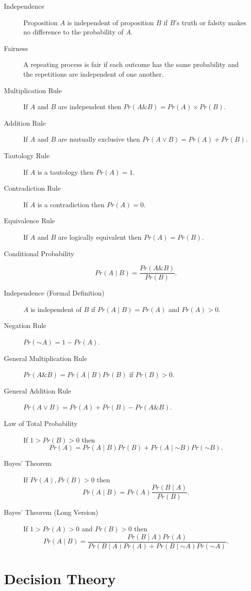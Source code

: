 \documentclass[justified]{tufte-book}
\newcommand{\given}{\mid}
\renewcommand{\neg}{\mathbin{\sim}}
\renewcommand{\wedge}{\mathbin{\&}}
\newcommand{\p}{Pr}
\theoremstyle{definition}
\theoremstyle{definition}
\theoremstyle{definition}
\theoremstyle{definition}
\theoremstyle{remark}
\begin{document}
\begin{description}
\item[Independence]
Proposition \(A\) is independent of proposition \(B\) if \(B\)'s truth or falsity makes no difference to the probability of \(A\).
\item[Fairness]
A repeating process is fair if each outcome has the same probability and the repetitions are independent of one another.
\item[Multiplication Rule]
If \(A\) and \(B\) are independent then \(\p(A \wedge B) = \p(A) \times \p(B)\).
\item[Addition Rule]
If \(A\) and \(B\) are mutually exclusive then \(\p(A \vee B) = \p(A) + \p(B)\).
\item[Tautology Rule]
If \(A\) is a tautology then \(\p(A) = 1\).
\item[Contradiction Rule]
If \(A\) is a contradiction then \(\p(A) = 0\).
\item[Equivalence Rule]
If \(A\) and \(B\) are logically equivalent then \(\p(A) = \p(B)\).
\item[Conditional Probability]
\[\p(A \given B) = \frac{\p(A \wedge B)}{\p(B)}.\]
\item[Independence (Formal Definition)]
\(A\) is independent of \(B\) if \(\p(A \given B) = \p(A)\) and \(\p(A) > 0\).
\item[Negation Rule]
\(\p(\neg A) = 1 - \p(A)\).
\item[General Multiplication Rule]
\(\p(A \wedge B) = \p(A \given B) \p(B)\) if \(\p(B) > 0\).
\item[General Addition Rule]
\(\p(A \vee B) = \p(A) + \p(B) - \p(A \wedge B)\).
\item[Law of Total Probability]
If \(1 > \p(B) > 0\) then \[\p(A) = \p(A \given B)\p(B) + \p(A \given \neg B)\p(\neg B).\]
\item[Bayes' Theorem]
If \(\p(A), \p(B) > 0\) then \[\p(A \given B) = \p(A) \frac{\p(B \given A)}{\p(B)}.\]
\item[Bayes' Theorem (Long Version)]
If \(1 > \p(A) > 0\) and \(\p(B) > 0\) then \[\p(A \given B) = \frac{\p(B \given A)\p(A)}{\p(B \given A)\p(A) + \p(B \given \neg A)\p(\neg A)}.\]
\end{description}

\hypertarget{decision-theory}{%
\section*{Decision Theory}\label{decision-theory}}
\end{document}
